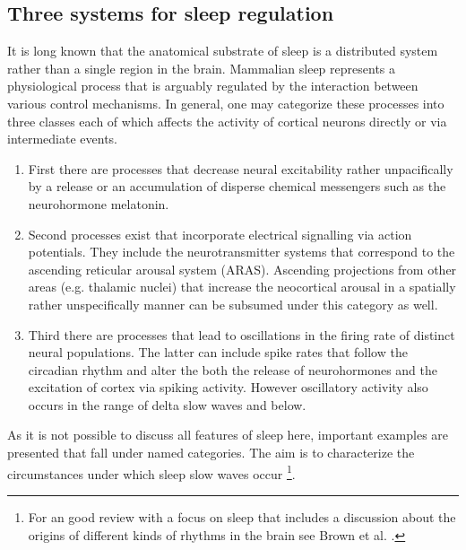 
\subsection{Three systems for sleep regulation}
It is long known that the anatomical substrate of sleep is a distributed system rather than a single region in the brain\parencite{akert1965anatomical}. Mammalian sleep represents a physiological process that is arguably regulated by the interaction between various control mechanisms. In general, one may categorize these processes into three classes each of which affects the activity of cortical neurons directly or via intermediate events.
\begin{enumerate}[label={(\arabic*)}]
    \item First there are processes that decrease neural excitability rather unpacifically by a release or an accumulation of disperse chemical messengers such as the neurohormone melatonin.
    \item Second processes exist that incorporate electrical signalling via action potentials. They include the neurotransmitter systems that correspond to the ascending reticular arousal system (ARAS). Ascending projections from other areas (e.g. thalamic nuclei) that increase the neocortical arousal in a spatially rather unspecifically manner can be subsumed under this category as well.
    \item Third there are processes that lead to oscillations in the firing rate of distinct neural populations. The latter can include spike rates that follow the circadian rhythm and alter the both the release of neurohormones and the excitation of cortex via spiking activity. However oscillatory activity also occurs in the range of delta slow waves and below.
\end{enumerate}
As it is not possible to discuss all features of sleep here, important examples are presented that fall under named categories. The aim is to characterize the circumstances under which sleep slow waves occur \footnote{For an good review with a focus on sleep that includes a discussion about the origins of different kinds of rhythms in the brain see Brown et al. \parencite*{brown2012control}.}.\\
